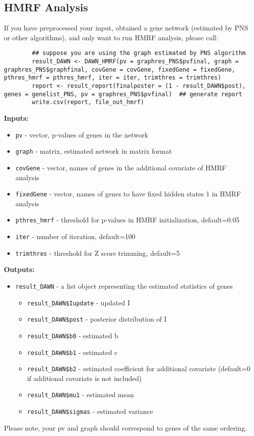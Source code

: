\documentclass{article}
\begin{document}
	\subsection{HMRF Analysis}
	If you have preprocessed your input, obtained a gene network (estimated by PNS or other algorithms), and only want to run HMRF analysis, please call:
	\begin{lstlisting}
		## suppose you are using the graph estimated by PNS algorithm
		result_DAWN <- DAWN_HMRF(pv = graphres_PNS$pvfinal, graph = graphres_PNS$graphfinal, covGene = covGene, fixedGene = fixedGene, pthres_hmrf = pthres_hmrf, iter = iter, trimthres = trimthres)
		report <- result_report(finalposter = (1 - result_DAWN$post), genes = genelist_PNS, pv = graphres_PNS$pvfinal)  ## generate report
		write.csv(report, file_out_hmrf)
	\end{lstlisting}
	\textbf{Inputs:}
	\begin{itemize}
		\item \texttt{pv} - vector, p-values of genes in the network
		\item \texttt{graph} - matrix, estimated network in matrix format
		\item \texttt{covGene} - vector, names of genes in the additional covariate of HMRF analysis
		\item \texttt{fixedGene} - vector, names of genes to have fixed hidden states 1 in HMRF analysis
		\item \texttt{pthres\_hmrf} - threshold for p-values in HMRF initialization, default=0.05
		\item \texttt{iter} - number of iteration, default=100
		\item \texttt{trimthres} - threshold for Z score trimming, default=5
	\end{itemize}
	\textbf{Outputs:}
	\begin{itemize}
		\item \texttt{result\_DAWN} - a list object representing the estimated statistics of genes
		\begin{itemize}
			\item \texttt{result\_DAWN\$Iupdate} - updated I
			\item \texttt{result\_DAWN\$post} - posterior distribution of I
			\item \texttt{result\_DAWN\$b0} - estimated b
			\item \texttt{result\_DAWN\$b1} - estimated c
			\item \texttt{result\_DAWN\$b2} - estimated coefficient for additional covariate (default=0 if additional covariate is not included)
			\item \texttt{result\_DAWN\$mu1} - estimated mean
			\item \texttt{result\_DAWN\$sigmas} - estimated variance
		\end{itemize}
		
	\end{itemize}
	Please note, your pv and graph should correspond to genes of the same ordering.
\end{document}
